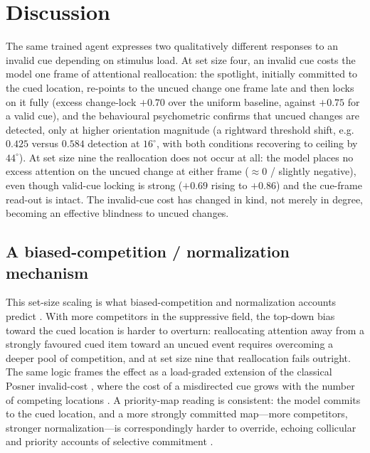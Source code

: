 \section{Discussion}
The same trained agent expresses two qualitatively different responses to an invalid cue depending on stimulus load. At set size four, an invalid cue costs the model one frame of attentional reallocation: the spotlight, initially committed to the cued location, re-points to the uncued change one frame late and then locks on it fully (excess change-lock $+0.70$ over the uniform baseline, against $+0.75$ for a valid cue), and the behavioural psychometric confirms that uncued changes are detected, only at higher orientation magnitude (a rightward threshold shift, e.g. $0.425$ versus $0.584$ detection at $16^\circ$, with both conditions recovering to ceiling by $44^\circ$). At set size nine the reallocation does not occur at all: the model places no excess attention on the uncued change at either frame ($\approx 0$ / slightly negative), even though valid-cue locking is strong ($+0.69$ rising to $+0.86$) and the cue-frame read-out is intact. The invalid-cue cost has changed in kind, not merely in degree, becoming an effective blindness to uncued changes.

\subsection{A biased-competition / normalization mechanism}
This set-size scaling is what biased-competition and normalization accounts predict \citep{desimone1995neural,reynolds1999competitive,reynolds2000attention,reynolds2009normalization}. With more competitors in the suppressive field, the top-down bias toward the cued location is harder to overturn: reallocating attention away from a strongly favoured cued item toward an uncued event requires overcoming a deeper pool of competition, and at set size nine that reallocation fails outright. The same logic frames the effect as a load-graded extension of the classical Posner invalid-cost \citep{posner1980attention,posner1994visual}, where the cost of a misdirected cue grows with the number of competing locations \citep{carrasco2011visual}. A priority-map reading is consistent: the model commits to the cued location, and a more strongly committed map---more competitors, stronger normalization---is correspondingly harder to override, echoing collicular and priority accounts of selective commitment \citep{krauzlis2018selective,krauzlis2013superior,zenon2012attention}.


